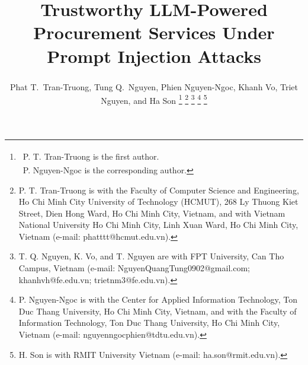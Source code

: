 \documentclass[journal,11pt]{IEEEtran}
\newcommand{\firstauthorsign}{\textsuperscript{\dag}}
\newcommand{\corrauthorletter}{\textsuperscript{\Letter}}
\begin{document}
\title{Trustworthy LLM-Powered Procurement Services Under Prompt Injection Attacks}

\author{%
Phat T.~Tran-Truong\firstauthorsign,
Tung Q.~Nguyen,
Phien Nguyen-Ngoc\corrauthorletter,
Khanh Vo,
Triet Nguyen,
and Ha Son%
\thanks{\firstauthorsign~P. T. Tran-Truong is the first author.\\
\corrauthorletter~P. Nguyen-Ngoc is the corresponding author.}%
\thanks{P. T. Tran-Truong is with the Faculty of Computer Science and
Engineering, Ho Chi Minh City University of Technology (HCMUT), 268 Ly Thuong
Kiet Street, Dien Hong Ward, Ho Chi Minh City, Vietnam, and with Vietnam
National University Ho Chi Minh City, Linh Xuan Ward, Ho Chi Minh City,
Vietnam (e-mail: phatttt@hcmut.edu.vn).}%
\thanks{T. Q. Nguyen, K. Vo, and T. Nguyen are with FPT
University, Can Tho Campus, Vietnam (e-mail: NguyenQuangTung0902@gmail.com;
khanhvh@fe.edu.vn; trietnm3@fe.edu.vn).}%
\thanks{P. Nguyen-Ngoc is with the Center for Applied Information Technology,
Ton Duc Thang University, Ho Chi Minh City, Vietnam, and with the Faculty of
Information Technology, Ton Duc Thang University, Ho Chi Minh City, Vietnam
(e-mail: nguyenngocphien@tdtu.edu.vn).}%
\thanks{H. Son is with RMIT University Vietnam (e-mail:
ha.son@rmit.edu.vn).}%
}

\maketitle
\end{document}
